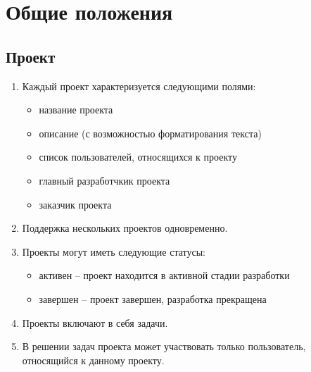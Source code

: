 \documentclass[14pt,a4paper]{extarticle}
\begin{document}
	
	\section {Общие положения}
	\subsection {Проект}
	\begin{enumerate}
		\item Каждый проект характеризуется следующими полями:
		\begin{itemize}
			\item название проекта
			\item описание (с возможностью форматирования текста)
			\item список пользователей, относящихся к проекту
			\item главный разработчкик проекта
			\item заказчик проекта
		\end{itemize}
		
		\item Поддержка нескольких проектов одновременно.
		
		\item Проекты могут иметь следующие статусы:
		\begin{itemize}
			\item активен -- проект находится в активной стадии разработки
			\item завершен -- проект завершен, разработка прекращена
		\end{itemize}
		
		\item Проекты включают в себя задачи.
		
		\item В решении задач проекта может участвовать только пользователь, относящийся к данному проекту.
		
	\end{enumerate}
		
\end{document}
